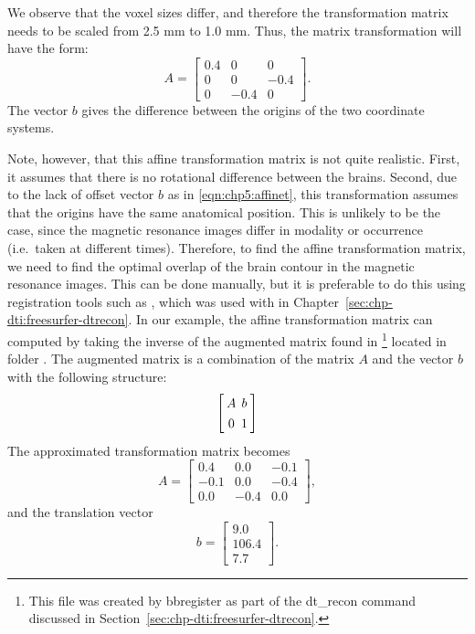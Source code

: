
We observe that the voxel sizes differ, and therefore the transformation matrix 
needs to be scaled from 2.5 mm to 1.0 mm. Thus, the matrix transformation will 
have the form: 
\[
A = \left[
\begin{array}{ccc}
0.4 & 0 & 0 \\
0 & 0 & -0.4 \\
0 & -0.4 & 0
\end{array}\right].
\]
The vector $b$ gives the difference between the origins of the two
coordinate systems.

Note, however, that this affine transformation matrix is not quite
realistic. First, it assumes that there is no rotational difference
between the brains. Second, due to the lack of offset vector $b$ as in
\eqref{eqn:chp5:affinet}, this transformation assumes that the origins
have the same anatomical position. This is unlikely to be the case,
since the magnetic resonance images differ in modality or occurrence
(i.e.~taken at different times). Therefore, to find the affine
transformation matrix, we need to find the optimal overlap of the
brain contour in the magnetic resonance images. This can be done
manually, but it is preferable to do this using registration tools
such as , which was used with  in
Chapter~\ref{sec:chp-dti:freesurfer-dtrecon}. In our example, the
affine transformation matrix can computed by taking the inverse of the
augmented matrix found in \footnote{This file was
  created by bbregister as part of the dt\_recon command discussed in
  Section~\ref{sec:chp-dti:freesurfer-dtrecon}.} located in folder
. The augmented matrix is a combination
of the matrix $A$ and the vector $b$ with the following structure:
\[\arraycolsep=2.0pt\def\arraystretch{1.3}
\left[
\begin{array}{cc}
  A  & b \\
  0 & 1\\
\end{array}\right]
\] 
The approximated
transformation matrix becomes
\[
A = \left[
\begin{array}{ccc}
  0.4 & 0.0 &-0.1 \\
 -0.1 & 0.0 &-0.4 \\
  0.0 &-0.4 & 0.0 
\end{array}\right],
\]
and the translation vector 
\[
b = \left[
\begin{array}{c}
  9.0 \\
106.4 \\
  7.7
\end{array}\right].
\]











